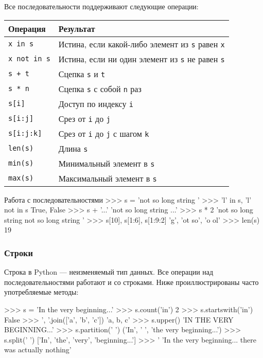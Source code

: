 Все последовательности поддерживают следующие операции:
\begin{center}
  \begin{tabular}{lp{7.5cm}}
    \toprule
    Операция & Результат \\
    \midrule
    \texttt{x in s} & Истина, если какой-либо элемент из \texttt{s} равен \texttt{x} \\
    \texttt{x not in s} & Истина, если ни один элемент из \texttt{s} не равен \texttt{s} \\
    \texttt{s + t} & Сцепка \texttt{s} и \texttt{t} \\
    \texttt{s * n} & Сцепка \texttt{s} с собой \texttt{n} раз \\
    \texttt{s[i]} & Доступ по индексу \texttt{i} \\
    \texttt{s[i:j]} & Срез от \texttt{i} до \texttt{j} \\
    \texttt{s[i:j:k]} & Срез от \texttt{i} до \texttt{j} с шагом \texttt{k} \\
    \texttt{len(s)} & Длина \texttt{s} \\
    \texttt{min(s)} & Минимальный элемент в \texttt{s} \\
    \texttt{max(s)} & Максимальный элемент в \texttt{s} \\
    \bottomrule
  \end{tabular}
\end{center}

\begin{pylst}{Работа с последовательностями}{}
>>> s = 'not so long string '
>>> 'l' in s, 'l' not in s
True, False
>>> s + '...'
'not so long string ...'
>>> s * 2
'not so long string not so long string '
>>> s[10], s[1:6], s[1:9:2]
'g', 'ot so', 'o ol'
>>> len(s)
19
\end{pylst}

\subsubsection{Строки}
Строка в Python --- неизменяемый тип данных. Все операции над последовательностями работают и со строками. Ниже проиллюстрированы часто употребляемые методы:
\begin{pylst}{}{}
>>> s = 'In the very beginning...'
>>> s.count('in')
2
>>> s.startswith('in')
False
>>> ', '.join(['a', 'b', 'c'])
'a, b, c'
>>> s.upper()
'IN THE VERY BEGINNING...'
>>> s.partition(' ')
('In', ' ', 'the very beginning...')
>>> s.split(' ')
['In', 'the', 'very', 'beginning...']
>>> '%
'In the very beginning... there was actually nothing'
\end{pylst}

